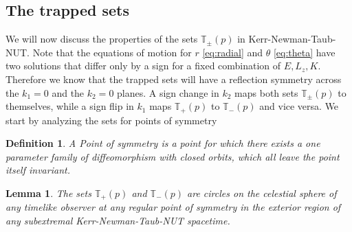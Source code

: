 \documentclass[reqno]{amsart}
\numberwithin{equation}{section}
\theoremstyle{plain}
\newtheorem{lemma}[thm]{Lemma}
\newtheorem{definition}[thm]{Definition}
\theoremstyle{definition}
\begin{document}
\subsection{The trapped sets}\label{sec:Kerr-Newman-Taub-NUTshadow}
We will now discuss the properties of the sets  $\mathbb{T}_\pm(p)$ in Kerr-Newman-Taub-NUT. Note that the equations of motion for $r$ \eqref{eq:radial} and $\theta$ \eqref{eq:theta} have two solutions that differ only by a sign for a fixed combination of $E, L_z, K$. Therefore we know that the trapped sets will have a reflection symmetry across the $k_1=0$ and the $k_2=0$ planes. A sign change in $k_2$ maps both sets $\mathbb{T}_\pm(p)$ to themselves, while a sign flip in $k_1$ maps $\mathbb{T}_+(p)$ to $\mathbb{T}_-(p)$ and vice versa. We start by analyzing the sets for points of symmetry
\begin{definition}A Point of symmetry is a point for which there exists a one parameter family of diffeomorphism with closed orbits, which all leave the point itself invariant.\end{definition}
\begin{lemma}\label{lem:symmetry}The sets $\mathbb{T}_+(p)$ and $\mathbb{T}_-(p)$ are circles on the celestial sphere of any timelike observer at any regular point of symmetry in the exterior region of any subextremal Kerr-Newman-Taub-NUT spacetime. 
\end{lemma}
\end{document}
